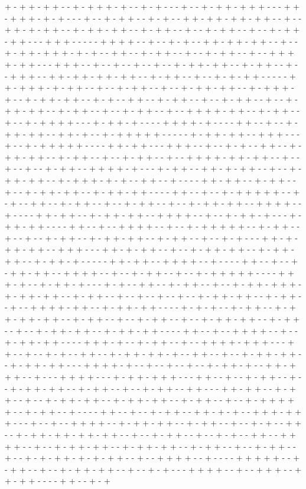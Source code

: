 + - + + - + + - - + - + + + - + - - + - + - - - + - - + - + + - + + + - - - + + - + + + - + - + - - - + - - + - + + - - + - + - - + + - + + - + + - + + - - + - - + + - + - + + - - + - + + - + + - - + - + + - - + - - + - + + - - + - - + - + + - + + - - - + + + - - - - - + + + + - - + - - + - + - - + + - + + - + + - - + - - + - + + - + + + - + - + - - + + - - + - + + - - + - - + - + + - - + - - + + + + - + + - - - + + + - - + - - + - - + - - + - - + - + + - + + - - + - + + - - + - - + + + - - + + - + + - + + - + + - - + - + + - - + - - + - + - + + - - - - - + + - + + + - + - + + - - + - - + - + + - - + - - + - + + - + + - - + - + + + - + - - + - + + - + + - - + - + - - + + - - + - + + - - + - - + - + + - - + - - + - + + - + + - - + - + + - - + - - + - + + - - + - - + + + + - + + - - + - + + - - + - - + - + + + + - - - + - + + - + - - - - + + + + - + - - - - + + - - + - - + - + + - + + - - + + - + - - + - + + + + + - - - - - + - + + - + + - - + + + - - - + - - + - + + + + + - - - - + + - + + - - - + + + - - + - - + - + - - + + - - + - + + - + + - - + - + + - - + - - + - + + - - + - - + + + + - + + - + + - - + - - + - - + - - + - + + - - + + + + - + - - - + - + + - - + + - + - + + - - + - - + - + + - + + - - + - + + + - + - + - - + + - - + - - - - + + - + + - - + - + + - - + - - + - + + - + + - - + - + + - + + - - - - + + - - + - - + - + + + + + - - + - + - - + + - - + - + + - - + - - + - + + - - + - - + - + + - + + - - + + + + - - + - - - - + + - + + - - + - + + - + + - - + + + + - - + - - + - + + - + - - - + - + + - + + - - - - + + - - + - - + + + + - - + - - + - + + + + + - - + - + + - - + - - + - - + - + + - - + - + + - + + - - + - + + - - + - - + - + - - - + + - + - + + - + + - - + + + - - - + + - + - + + - - + - - + - + + - + + - - + - + + - + + - - + - + + - + - - - - - + + - + + - - + + + + - - + - - - - + + - - + - - + - + + - + + - - + + + + - - + - - + - + + - - + - - + - + + + + + - - - - + + + - + - - + - + + - + - - - + - + - - + + - - + - + + - - + - - + - + + - + + + - + - + + - + + - - + - + + - - + - - + - - + - - + - - + - + + - + + - - + - + + - - + - - + + + + - + + - - + - + + - + + - - - - + - + - + - - + - + + - - + - + + - + + - + + - - + - + + - - + - - + - + + - - + - - + - + + - + + - - + - + + - - + - - + - + + - + + - - + - + + - + + - - - - + + - - + - - + + + + - - + - - + - + + - + + - - - - + + + - + - - + - + + - - + - - + + + + - + + + - - - + + - - + - - + - + - - + + - - + - + + - + + - + - - + + - - + - - + - + + - + + - - + - + + - + + - - - + + + + - + - - + - - + - - + - - + - + + - + - - + + - + + + - - + - - - + + + + - - - + - + + - + + + - - - + + - - + - - + - + + - - + - - + - + + - + + - - + - + + - - + - - + - + + - - + + - - - + + - + + - - + - + + - - + - - + - + + - + + - - + - + + - + + - - + - + + - - + - - + - + + + + + - - + - + + - - + - - - - + + - - + - - + - + + - - + + - + - + - - + + + - + + + - - - + - - + - - + + + + - - + - + + - + + - - + - + + - - + - - + - + - - + + - - + - + + - + + - + + - + + - - + - - + - + + - - + - - + - + - - + + - - + + + + - - + - - + - + + - + + - - + - + + - + + - - + - + + - - + - - + - + + - - + - - + - + - + + - + - + - + + - - + - - + + + + - - + - - - - + + + + + - - + - + + - - + - - + - + + - + + - - + - - + - + - - - + + + + - - + - - + + + - - + + - + + - - - - + + - - + - + 